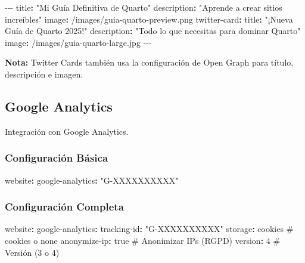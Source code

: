 \documentclass[
  doc,
  floatsintext,
  longtable,
  a4paper,
  nolmodern,
  notxfonts,
  notimes,
  12pt,
  colorlinks=true,linkcolor=blue,citecolor=blue,urlcolor=blue]{apa7}
\newenvironment{Shaded}{\begin{snugshade}}{\end{snugshade}}
\newcommand{\AttributeTok}[1]{\textcolor[rgb]{0.40,0.45,0.13}{#1}}
\newcommand{\CharTok}[1]{\textcolor[rgb]{0.13,0.47,0.30}{#1}}
\newcommand{\CommentTok}[1]{\textcolor[rgb]{0.37,0.37,0.37}{#1}}
\newcommand{\DecValTok}[1]{\textcolor[rgb]{0.68,0.00,0.00}{#1}}
\newcommand{\FunctionTok}[1]{\textcolor[rgb]{0.28,0.35,0.67}{#1}}
\newcommand{\KeywordTok}[1]{\textcolor[rgb]{0.00,0.23,0.31}{\textbf{#1}}}
\newcommand{\PreprocessorTok}[1]{\textcolor[rgb]{0.68,0.00,0.00}{#1}}
\newcommand{\StringTok}[1]{\textcolor[rgb]{0.13,0.47,0.30}{#1}}
\newcounter{none} %
\begin{document}
\begin{Shaded}
\begin{Highlighting}[]
\PreprocessorTok{{-}{-}{-}}
\FunctionTok{title}\KeywordTok{:}\AttributeTok{ }\StringTok{"Mi Guía Definitiva de Quarto"}
\FunctionTok{description}\KeywordTok{:}\AttributeTok{ }\StringTok{"Aprende a crear sitios increíbles"}
\FunctionTok{image}\KeywordTok{:}\AttributeTok{ /images/guia{-}quarto{-}preview.png}
\FunctionTok{twitter{-}card}\KeywordTok{:}
\AttributeTok{  }\FunctionTok{title}\KeywordTok{:}\AttributeTok{ }\StringTok{"¡Nueva Guía de Quarto 2025!"}
\AttributeTok{  }\FunctionTok{description}\KeywordTok{:}\AttributeTok{ }\StringTok{"Todo lo que necesitas para dominar Quarto"}
\AttributeTok{  }\FunctionTok{image}\KeywordTok{:}\AttributeTok{ /images/guia{-}quarto{-}large.jpg}
\PreprocessorTok{{-}{-}{-}}
\end{Highlighting}
\end{Shaded}

\textbf{Nota:} Twitter Cards también usa la configuración de Open Graph
para título, descripción e imagen.

\subsection{Google Analytics}\label{google-analytics}

Integración con Google Analytics.

\subsubsection{Configuración Básica}\label{configuraciuxf3n-buxe1sica-1}

\begin{Shaded}
\begin{Highlighting}[]
\FunctionTok{website}\KeywordTok{:}
\AttributeTok{  }\FunctionTok{google{-}analytics}\KeywordTok{:}\AttributeTok{ }\StringTok{"G{-}XXXXXXXXXX"}
\end{Highlighting}
\end{Shaded}

\subsubsection{Configuración
Completa}\label{configuraciuxf3n-completa-3}

\begin{Shaded}
\begin{Highlighting}[]
\FunctionTok{website}\KeywordTok{:}
\AttributeTok{  }\FunctionTok{google{-}analytics}\KeywordTok{:}
\AttributeTok{    }\FunctionTok{tracking{-}id}\KeywordTok{:}\AttributeTok{ }\StringTok{"G{-}XXXXXXXXXX"}
\AttributeTok{    }\FunctionTok{storage}\KeywordTok{:}\AttributeTok{ cookies}\CommentTok{                 \# cookies o none}
\AttributeTok{    }\FunctionTok{anonymize{-}ip}\KeywordTok{:}\AttributeTok{ }\CharTok{true}\CommentTok{               \# Anonimizar IPs (RGPD)}
\AttributeTok{    }\FunctionTok{version}\KeywordTok{:}\AttributeTok{ }\DecValTok{4}\CommentTok{                       \# Versión (3 o 4)}
\end{Highlighting}
\end{Shaded}
\end{document}
